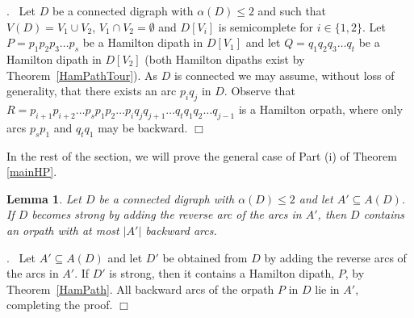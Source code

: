 \documentclass{article}
\newcommand{\2}{\vspace{2mm}}
\renewenvironment{proof}[1][]{\par \noindent {\bf Proof#1}.\ }{\hfill$\Box$
\par \vspace{11pt}}
\newtheorem{lemma}[theorem]{Lemma}
\theoremstyle{definition}
\begin{document}
\begin{proof}
 Let $D$ be a connected digraph with $\alpha(D) \leq 2$ and such that $V(D) = V_1 \cup V_2$, $V_1\cap V_2=\emptyset$ and $D[V_i]$ is semicomplete for $i \in \{1,2\}$.
Let $P=p_1 p_2 p_3 \ldots p_s$ be a Hamilton dipath in $D[V_1]$ and let
$Q=q_1 q_2 q_3 \ldots q_t$ be a Hamilton dipath in $D[V_2]$ (both Hamilton dipaths exist by Theorem~\ref{HamPathTour}).
As $D$ is connected we may assume, without loss of generality, that there exists an arc $p_i q_j$ in $D$.
Observe that 
\(
R=p_{i+1} p_{i+2} \ldots p_s p_1 p_2 \ldots p_i q_j q_{j+1} \ldots q_t q_1 q_2 \ldots q_{j-1}
\)
is a Hamilton orpath, where only arcs $p_s p_1$ and $q_t q_1$ may be backward.
\end{proof}

In the rest of the section, we will prove the general case of Part (i) of Theorem \ref{mainHP}.



\begin{lemma} \label{AddArc}
 Let $D$ be a connected digraph with $\alpha(D) \leq 2$ and let $A' \subseteq A(D)$.
If $D$ becomes strong by adding the reverse arc of the arcs in $A'$, then 
 $D$ contains an orpath with at most $|A'|$ backward arcs.
\end{lemma}

\begin{proof}
 Let $A' \subseteq A(D)$ and let $D'$ be obtained 
from $D$ by adding the reverse arcs of the arcs in $A'$.
If $D'$ is strong, then it contains a Hamilton dipath, $P$, by Theorem~\ref{HamPath}.
All backward arcs of the orpath $P$ in $D$  lie in $A'$, completing the proof.
\end{proof}
\end{document}
